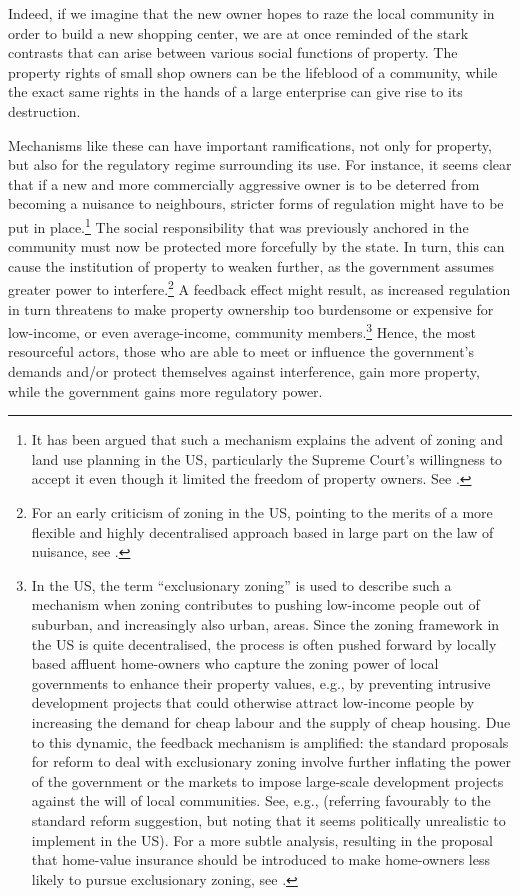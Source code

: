 Indeed, if we imagine that the new owner hopes to raze the local community in order to build a new shopping center, we are at once reminded of the stark contrasts that can arise between various social functions of property. The property rights of small shop owners can be the lifeblood of a community, while the exact same rights in the hands of a large enterprise can give rise to its destruction.

Mechanisms like these can have important ramifications, not only for property, but also for the regulatory regime surrounding its use. For instance, it seems clear that if a new and more commercially aggressive owner is to be deterred from becoming a nuisance to neighbours, stricter forms of regulation might have to be put in place.\footnote{It has been argued that such a mechanism explains the advent of zoning and land use planning in the US, particularly the Supreme Court's willingness to accept it even though it limited the freedom of property owners. See \cite[99-100]{shoked11}.} The social responsibility that was previously anchored in the community must now be protected more forcefully by the state. In turn, this can cause the institution of property to weaken further, as the government assumes greater power to interfere.\footnote{For an early criticism of zoning in the US, pointing to the merits of a more flexible and highly decentralised approach based in large part on the law of nuisance, see \cite{ellickson73}.} A feedback effect might result, as increased regulation in turn threatens to make property ownership too burdensome or expensive for low-income, or even average-income, community members.\footnote{In the US, the term ``exclusionary zoning'' is used to describe such a mechanism when zoning contributes to pushing low-income people out of suburban, and increasingly also urban, areas. Since the zoning framework in the US is quite decentralised, the process is often pushed forward by locally based affluent home-owners who capture the zoning power of local governments to enhance their property values, e.g., by preventing intrusive development projects that could otherwise attract low-income people by increasing the demand for cheap labour and the supply of cheap housing. Due to this dynamic, the feedback mechanism is amplified: the standard proposals for reform to deal with exclusionary zoning involve further inflating the power of the government or the markets to impose large-scale development projects against the will of local communities. See, e.g., \cite[117-120]{mangin14} (referring favourably to the standard reform suggestion, but noting that it seems politically unrealistic to implement in the US). For a more subtle analysis, resulting in the proposal that home-value insurance should be introduced to make home-owners less likely to pursue exclusionary zoning, see \cite{fischel04}.} Hence, the most resourceful actors, those who are able to meet or influence the government's demands and/or protect themselves against interference, gain more  property, while the government gains more regulatory power.

